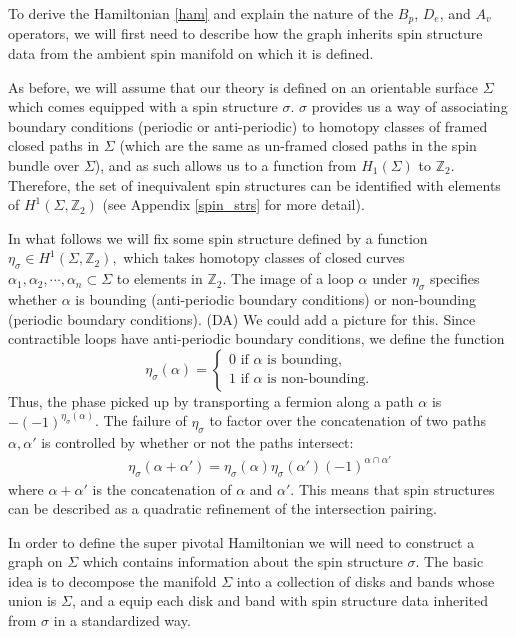 \documentclass[12pt,a4paper]{article}
\newcommand{\zz}{\mathbb{Z}}
\newcommand{\zt}{\mathbb{Z}_2}
\newcommand\be            {\begin{equation}}
\newcommand\ee            {\end{equation}}
\newcommand{\dave}[1]{{\color{ao(english)}\footnotesize{(DA) #1}}}
\begin{document}
To derive the Hamiltonian \eqref{ham} and explain the nature of the $B_p$, $D_e$, and $A_v$ operators, we will first need to describe how the graph inherits spin structure data from the ambient spin manifold on which it is defined. 

As before, we will assume that our theory is defined on an orientable surface $\Sigma$ which comes equipped with a spin structure $\sigma$.
$\sigma$ provides us a way of associating boundary conditions (periodic or anti-periodic) to homotopy classes of framed closed paths  
in $\Sigma$ (which are the same as un-framed closed paths in the spin bundle over $\Sigma$), and as such allows us to a function from $H_1(\Sigma)$ to $\zz_2$.
Therefore, the set of inequivalent spin structures can be identified with elements of   $H^1(\Sigma, \mathbb{Z}_2)$ (see Appendix \ref{spin_strs} for more detail).

In what follows we will fix some spin structure defined by a function $\eta_\sigma \in H^1(\Sigma, \mathbb{Z}_2),$ which takes homotopy classes of closed curves 
$\alpha_1, \alpha_2, \cdots, \alpha_n \subset \Sigma$ to elements in $\zt$.
The image of a loop $\alpha$ under $\eta_\sigma$ specifies whether $\alpha$ is bounding (anti-periodic boundary conditions) or non-bounding (periodic boundary conditions).
\dave{We could add a picture for this. }
Since contractible loops have anti-periodic boundary conditions, we define the function
\be \eta_\sigma(\alpha) = \begin{cases} 0 \text{\ if $\alpha$ is bounding,}\\
1 \text{\ if $\alpha$ is non-bounding.}\end{cases} \ee
Thus, the phase picked up by transporting a fermion along a path $\alpha$ is $-(-1)^{\eta_{\sigma}(\alpha)}$.
The failure of $\eta_\sigma$ to factor over the concatenation of two paths $\alpha,\alpha'$ is controlled by whether or not the paths intersect:
\begin{align}
\eta_{\sigma} (\alpha + \alpha') = \eta_{\sigma}(\alpha) \eta_{\sigma}(\alpha') (-1)^{\alpha \cap \alpha'}
\end{align}
where $\alpha+\alpha'$ is the concatenation of $\alpha$ and $\alpha'$. 
This means that spin structures can be described as a quadratic refinement of the intersection pairing. 


In order to define the super pivotal Hamiltonian we will need to construct a graph on $\Sigma$ which contains information about the spin structure $\sigma$. 
The basic idea is to decompose the manifold $\Sigma$ into a collection of disks and bands whose union is $\Sigma$, and a equip each disk and band with spin structure data inherited from $\sigma$ in a standardized way.
\end{document}
